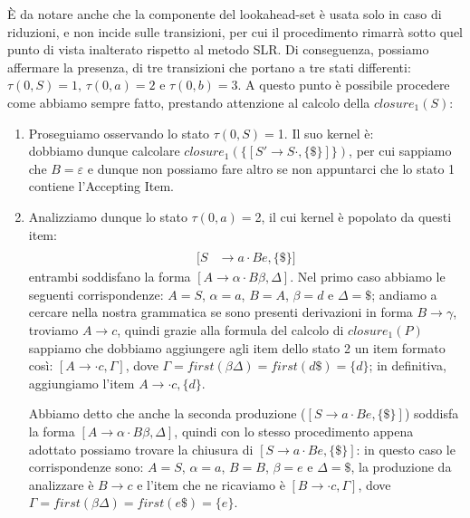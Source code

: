 \documentclass[class=book, crop=false, oneside, 12pt]{standalone}
\begin{document}
È da notare anche che la componente del lookahead-set è usata solo in caso di riduzioni, e non incide sulle transizioni, per cui il procedimento rimarrà sotto quel punto di vista inalterato rispetto al metodo SLR. Di conseguenza, possiamo affermare la presenza, di tre transizioni che portano a tre stati differenti: \(\tau(0,S)=1 \textrm{, } \tau(0,a)=2 \textrm{ e } \tau(0,b)=3\). A questo punto è possibile procedere come abbiamo sempre fatto, prestando attenzione al calcolo della \(closure_1(S)\):
\begin{enumerate}
    \item Proseguiamo osservando lo stato \(\tau(0, S)=\)1. Il suo kernel è:
    \begin{equation*}
        [S' \to S \cdot, \{\$\}]
    \end{equation*}
    dobbiamo dunque calcolare \(closure_1(\{[S' \to S \cdot, \{\$\}]\})\), per cui sappiamo che \(B = \varepsilon\) e dunque non possiamo fare altro se non appuntarci che lo stato 1 contiene l'Accepting Item.
    \item Analizziamo dunque lo stato \(\tau(0, a)=\)2, il cui kernel è popolato da questi item:
    \begin{align*}
        [S &\to a \cdot Ad, \{\$\}] \\
        [S &\to a \cdot Be, \{\$\}]
    \end{align*}
    entrambi soddisfano la forma \([A \rightarrow \alpha \cdot B \beta, \Delta]\).
    Nel primo caso abbiamo le seguenti corrispondenze: \(A=S\), \(\alpha = a\), \(B = A\), \(\beta = d\) e \(\Delta=\$\); andiamo a cercare nella nostra grammatica se sono presenti derivazioni in forma \(B \to \gamma\), troviamo \(A \to c\), quindi grazie alla formula del calcolo di \(closure_1(P)\) sappiamo che dobbiamo aggiungere agli item dello stato 2 un item formato così: \([A \to \cdot c, {\Gamma}]\), dove \(\Gamma = first(\beta\Delta) = first(d\$) = \{d\}\); in definitiva, aggiungiamo l'item \(A \to \cdot c, \{d\}\).

    Abbiamo detto che anche la seconda produzione (\([S \to a \cdot Be, \{\$\}]\)) soddisfa la forma \([A \rightarrow \alpha \cdot B \beta, \Delta]\), quindi con lo stesso procedimento appena adottato possiamo trovare la chiusura di \([S \to a \cdot Be, \{\$\}]\): in questo caso le corrispondenze sono: \(A=S\), \(\alpha=a\), \(B=B\), \(\beta=e\) e \(\Delta=\$\), la produzione da analizzare è \(B \to c\) e l'item che ne ricaviamo è \([B \to \cdot c, {\Gamma}]\), dove \(\Gamma = first(\beta\Delta) = first(e\$) = \{e\}\).
    

\end{enumerate}
\end{document}
